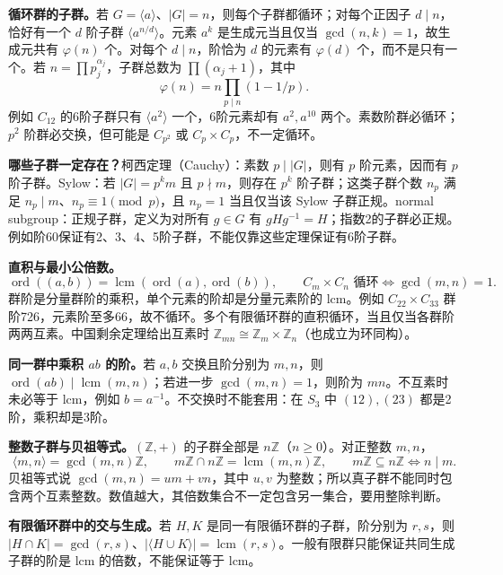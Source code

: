 \documentclass[11pt,a4paper,fontset=fandol]{ctexart}
\begin{document}
\textbf{循环群的子群。}若 $G=\langle a\rangle$、$|G|=n$，则每个子群都循环；对每个正因子 $d\mid n$，恰好有一个 $d$ 阶子群 $\langle a^{n/d}\rangle$。元素 $a^k$ 是生成元当且仅当 $\gcd(n,k)=1$，故生成元共有 $\varphi(n)$ 个。对每个 $d\mid n$，阶恰为 $d$ 的元素有 $\varphi(d)$ 个，而不是只有一个。若 $n=\prod p_j^{\alpha_j}$，子群总数为 $\prod(\alpha_j+1)$，其中
\[
\varphi(n)=n\prod_{p\mid n}(1-1/p).
\]
例如 $C_{12}$ 的6阶子群只有 $\langle a^2\rangle$ 一个，6阶元素却有 $a^2,a^{10}$ 两个。素数阶群必循环；$p^2$ 阶群必交换，但可能是 $C_{p^2}$ 或 $C_p\times C_p$，不一定循环。

\textbf{哪些子群一定存在？}柯西定理（Cauchy）：素数 $p\mid|G|$，则有 $p$ 阶元素，因而有 $p$ 阶子群。Sylow：若 $|G|=p^km$ 且 $p\nmid m$，则存在 $p^k$ 阶子群；这类子群个数 $n_p$ 满足 $n_p\mid m$、$n_p\equiv1\pmod p$，且 $n_p=1$ 当且仅当该 Sylow 子群正规。normal subgroup：正规子群，定义为对所有 $g\in G$ 有 $gHg^{-1}=H$；指数2的子群必正规。例如阶60保证有2、3、4、5阶子群，不能仅靠这些定理保证有6阶子群。

\textbf{直积与最小公倍数。}
\begin{equation}
\operatorname{ord}((a,b))=\operatorname{lcm}(\operatorname{ord}(a),\operatorname{ord}(b)),\qquad
C_m\times C_n\text{ 循环}\iff\gcd(m,n)=1.
\label{review:direct-product}
\end{equation}
群阶是分量群阶的乘积，单个元素的阶却是分量元素阶的 lcm。例如 $C_{22}\times C_{33}$ 群阶726，元素阶至多66，故不循环。多个有限循环群的直积循环，当且仅当各群阶两两互素。中国剩余定理给出互素时 $\mathbb Z_{mn}\cong\mathbb Z_m\times\mathbb Z_n$（也成立为环同构）。

\textbf{同一群中乘积 $ab$ 的阶。}若 $a,b$ 交换且阶分别为 $m,n$，则 $\operatorname{ord}(ab)\mid\operatorname{lcm}(m,n)$；若进一步 $\gcd(m,n)=1$，则阶为 $mn$。不互素时未必等于 lcm，例如 $b=a^{-1}$。不交换时不能套用：在 $S_3$ 中 $(12),(23)$ 都是2阶，乘积却是3阶。

\textbf{整数子群与贝祖等式。}$(\mathbb Z,+)$ 的子群全部是 $n\mathbb Z$（$n\ge0$）。对正整数 $m,n$，
\begin{equation}
\langle m,n\rangle=\gcd(m,n)\mathbb Z,\qquad
m\mathbb Z\cap n\mathbb Z=\operatorname{lcm}(m,n)\mathbb Z,\qquad
m\mathbb Z\subseteq n\mathbb Z\iff n\mid m.
\label{review:integer-subgroups}
\end{equation}
贝祖等式说 $\gcd(m,n)=um+vn$，其中 $u,v$ 为整数；所以真子群不能同时包含两个互素整数。数值越大，其倍数集合不一定包含另一集合，要用整除判断。

\textbf{有限循环群中的交与生成。}若 $H,K$ 是同一有限循环群的子群，阶分别为 $r,s$，则 $|H\cap K|=\gcd(r,s)$、$|\langle H\cup K\rangle|=\operatorname{lcm}(r,s)$。一般有限群只能保证共同生成子群的阶是 lcm 的倍数，不能保证等于 lcm。
\end{document}
